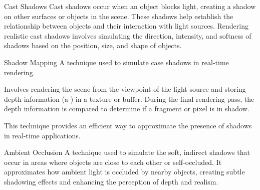 \documentclass[../COS3712_Notes.tex]{subfiles}
\begin{document}
      \begin{definition}{Cast Shadows}
        Cast shadows occur when an object blocks light, creating a shadow on other surfaces
        or objects in the scene.
        These shadows help establish the relationship between objects and their interaction
        with light sources.
        Rendering realistic cast shadows involves simulating the direction, intensity,
        and softness of shadows based on the position, size, and shape of objects.
      \end{definition}

      \begin{definition}{Shadow Mapping}
        A technique used to simulate case shadows in real-time rendering.

        Involves rendering the scene from the viewpoint of the light source and storing
        depth information (a ) in a texture or buffer.
        During the final rendering pass, the depth information is compared to determine
        if a fragment or pixel is in shadow.

        This technique provides an efficient way to approximate the presence of shadows
        in real-time applications.
      \end{definition}

      \begin{definition}{Ambient Occlusion}
        A technique used to simulate the soft, indirect shadows that occur in areas
        where objects are close to each other or self-occluded.
        It approximates how ambient light is occluded by nearby objects,
        creating subtle shadowing effects and enhancing the perception of depth and realism.
      \end{definition}

\end{document}
